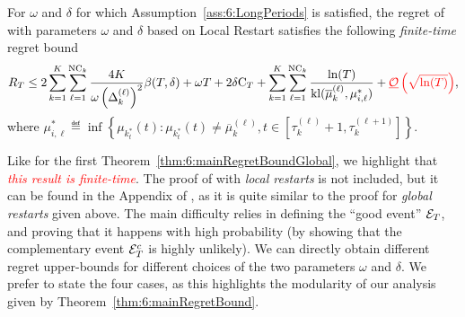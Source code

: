 \begin{theorem}\label{thm:6:mainRegretBound}
\begin{leftbar}[theorembar]  %
    For $\omega$ and $\delta$ for which Assumption~\ref{ass:6:LongPeriods} is satisfied, the regret of \GLRklUCB{} with parameters $\omega$ and $\delta$ based on Local Restart satisfies the following \emph{finite-time} regret bound
    \begin{equation}
        R_T \leq 2\sum_{k=1}^K\sum_{\ell=1}^{\text{NC}_k} \frac{4K}{\omega \left(\Delta_k^{(\ell)}\right)^2}\beta(T,\delta) +\omega T + 2 \delta \mathrm{C}_T  + \sum_{k=1}^K\sum_{\ell=1}^{\text{NC}_k} \frac{\ln(T)}{\mathrm{kl}(\overline{\mu}_k^{(\ell)},{\mu}^*_{i,\ell})} + \textcolor{red}{\underline{\mathcal{O}}\left(\sqrt{\ln(T)}\right)},
    \end{equation}
    where ${\mu}^*_{i,\ell} \eqdef \inf \left\{ \mu_{k_t^*}(t) : \mu_{k_t^*}(t) \neq \overline{\mu}_k^{(\ell)}, t \in [\tau_k^{(\ell)}+1, \tau_k^{(\ell+1)}]\right\}$.
\end{leftbar}  %
\end{theorem}

Like for the first Theorem~\ref{thm:6:mainRegretBoundGlobal},
we highlight that \textcolor{red}{\emph{this result is finite-time}}.
The proof of \GLRklUCB{} with \emph{local restarts} is not included, but it can be found in the Appendix of \cite{Besson2019GLRT}, as it is quite similar to the proof for \emph{global restarts} given above. The main difficulty relies in defining the ``good event'' $\mathcal{E}_T$, and proving that it happens with high probability (by showing that the complementary event $\mathcal{E}_T^c$ is highly unlikely).
%
We can directly obtain different regret upper-bounds for different choices of the two parameters $\omega$ and $\delta$.
We prefer to state the four cases, as this highlights the modularity of our analysis given by Theorem~\ref{thm:6:mainRegretBound}.


